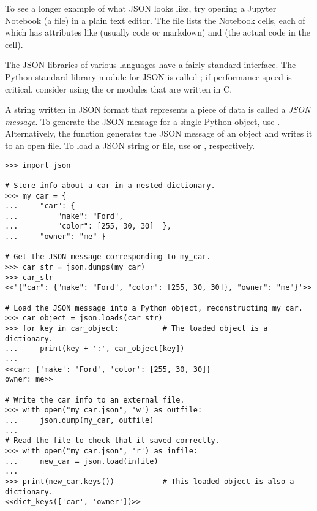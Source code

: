 \begin{info}
To see a longer example of what JSON looks like, try opening a Jupyter Notebook (a  file) in a plain text editor.
The file lists the Notebook cells, each of which has attributes like  (usually code or markdown) and  (the actual code in the cell).
\end{info}

The JSON libraries of various languages have a fairly standard interface.
The Python standard library module for JSON is called ; if performance speed is critical, consider using the  or  modules that are written in C.

A string written in JSON format that represents a piece of data is called a \emph{JSON message}.
To generate the JSON message for a single Python object, use .
Alternatively, the function  generates the JSON message of an object and writes it to an open file.
To load a JSON string or file, use  or , respectively.

\begin{lstlisting}
>>> import json

# Store info about a car in a nested dictionary.
>>> my_car = {
...     "car": {
...         "make": "Ford",
...         "color": [255, 30, 30]  },
...     "owner": "me" }

# Get the JSON message corresponding to my_car.
>>> car_str = json.dumps(my_car)
>>> car_str
<<'{"car": {"make": "Ford", "color": [255, 30, 30]}, "owner": "me"}'>>

# Load the JSON message into a Python object, reconstructing my_car.
>>> car_object = json.loads(car_str)
>>> for key in car_object:          # The loaded object is a dictionary.
...     print(key + ':', car_object[key])
...
<<car: {'make': 'Ford', 'color': [255, 30, 30]}
owner: me>>

# Write the car info to an external file.
>>> with open("my_car.json", 'w') as outfile:
...     json.dump(my_car, outfile)
...
# Read the file to check that it saved correctly.
>>> with open("my_car.json", 'r') as infile:
...     new_car = json.load(infile)
...
>>> print(new_car.keys())           # This loaded object is also a dictionary.
<<dict_keys(['car', 'owner'])>>
\end{lstlisting}

